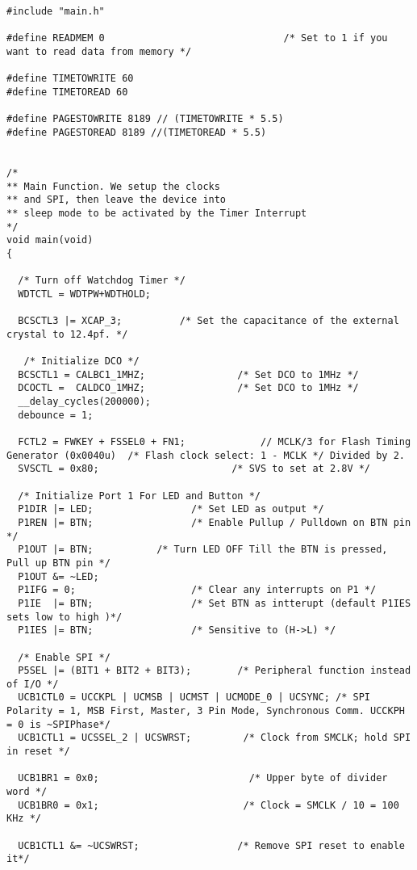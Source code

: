 \begin{lstlisting}[caption=Main.c,label=Code4]
#include "main.h"

#define READMEM 0                               /* Set to 1 if you want to read data from memory */

#define TIMETOWRITE 60
#define TIMETOREAD 60

#define PAGESTOWRITE 8189 // (TIMETOWRITE * 5.5)
#define PAGESTOREAD 8189 //(TIMETOREAD * 5.5)


/*
** Main Function. We setup the clocks
** and SPI, then leave the device into 
** sleep mode to be activated by the Timer Interrupt
*/
void main(void)
{
  
  /* Turn off Watchdog Timer */
  WDTCTL = WDTPW+WDTHOLD;                   

  BCSCTL3 |= XCAP_3;          /* Set the capacitance of the external crystal to 12.4pf. */  
  
   /* Initialize DCO */
  BCSCTL1 = CALBC1_1MHZ;                /* Set DCO to 1MHz */
  DCOCTL =  CALDCO_1MHZ;                /* Set DCO to 1MHz */
  __delay_cycles(200000);
  debounce = 1;
  
  FCTL2 = FWKEY + FSSEL0 + FN1;             // MCLK/3 for Flash Timing Generator (0x0040u)  /* Flash clock select: 1 - MCLK */ Divided by 2.
  SVSCTL = 0x80;                       /* SVS to set at 2.8V */
  
  /* Initialize Port 1 For LED and Button */
  P1DIR |= LED;                 /* Set LED as output */
  P1REN |= BTN;                 /* Enable Pullup / Pulldown on BTN pin */
  P1OUT |= BTN;           /* Turn LED OFF Till the BTN is pressed, Pull up BTN pin */
  P1OUT &= ~LED;            
  P1IFG = 0;                    /* Clear any interrupts on P1 */
  P1IE  |= BTN;                 /* Set BTN as intterupt (default P1IES sets low to high )*/
  P1IES |= BTN;                 /* Sensitive to (H->L) */
  
  /* Enable SPI */
  P5SEL |= (BIT1 + BIT2 + BIT3);        /* Peripheral function instead of I/O */
  UCB1CTL0 = UCCKPL | UCMSB | UCMST | UCMODE_0 | UCSYNC; /* SPI Polarity = 1, MSB First, Master, 3 Pin Mode, Synchronous Comm. UCCKPH = 0 is ~SPIPhase*/
  UCB1CTL1 = UCSSEL_2 | UCSWRST;         /* Clock from SMCLK; hold SPI in reset */
  
  UCB1BR1 = 0x0;                          /* Upper byte of divider word */
  UCB1BR0 = 0x1;                         /* Clock = SMCLK / 10 = 100 KHz */
  
  UCB1CTL1 &= ~UCSWRST;                 /* Remove SPI reset to enable it*/
  

\end{lstlisting}

